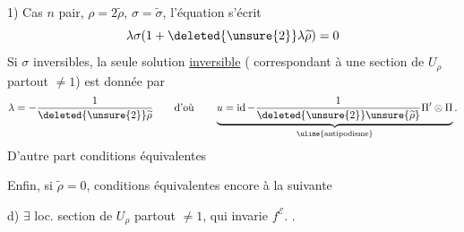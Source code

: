 1) Cas $n$ pair, $\rho=2\widetilde\rho$, $\sigma=\widetilde\sigma$, l'équation s'écrit
\[
\lambda\sigma(1+\deleted{\unsure{2}}\lambda\widetilde\rho)=0
\]
Si $\sigma$  inversibles,
la seule solution \uline{inversible}
( correspondant à une section de $U_\rho$ partout $\ne1$)
est donnée par
\[
\lambda=-\frac{1}{\deleted{\unsure{2}}\widetilde\rho}
\qquad\text{d'où}\qquad
\underbrace{u=\operatorname{id}-\frac{1}{\deleted{\unsure{2}}\unsure{\widetilde\rho}}\Pi'\otimes\Pi}
_{\uline{\text{antipodisme}}}.
\]
D'autre part conditions équivalentes

Enfin, si $\widetilde\rho=0$,  conditions équivalentes encore à la suivante

d) $\exists$ loc. section  de $U_\rho$ partout
$\ne1$, qui invarie $f^{\mathcal E}$.
.


